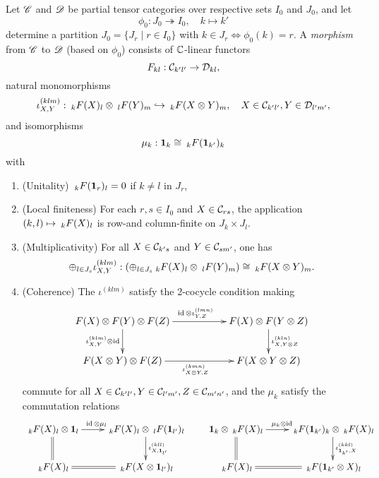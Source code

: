 \begin{Def} Let $\CatCC$ and $\CatDD$ be partial tensor categories over respective sets $I_0$ and $J_0$, and let \[\phi_0:J_0\twoheadrightarrow I_0,\quad k\mapsto k'\] determine a partition $J_0 = \{J_r\mid r\in I_0\}$ with $k\in J_r \iff \phi_0(k)=r$. 
A \emph{morphism} from $\CatCC$ to $\CatDD$ (based on $\phi_0$) consists of $\C$-linear functors \[F_{kl}: \CatC_{k'l'}\rightarrow \CatD_{kl},\] natural monomorphisms \[\iota^{(klm)}_{X,Y}: \GrDA{F(X)}{k}{l} \otimes \GrDA{F(Y)}{l}{m} \hookrightarrow \GrDA{F(X\otimes Y)}{k}{m}, \quad X\in \CatC_{k'l'},Y\in \CatD_{l'm'},\] and isomorphisms \[\mu_{k}:  \Unit_k \cong \GrDA{F(\Unit_{k'})}{k}{k}\] with \begin{enumerate}[label=(\alph*)]
\item (Unitality)  $\GrDA{F(\Unit_{r})}{k}{l}= 0$ if $k\neq l$ in $J_r$,
\item (Local finiteness) For each $r,s\in I_0$ and $X\in \CatC_{rs}$, the application $(k,l)\mapsto \GrDA{F(X)}{k}{l}$ is row-and column-finite on $J_k\times J_l$. 
\item (Multiplicativity) For all $X\in \CatC_{k's}$ and $Y\in \CatC_{sm'}$, one has\[\oplus_{l\in J_s} \iota^{(klm)}_{X,Y}: \left(\oplus_{l\in J_s} \GrDA{F(X)}{k}{l} \otimes \GrDA{F(Y)}{l}{m}\right) \cong \GrDA{F(X\otimes Y)}{k}{m}.\]
\item (Coherence) %
The $\iota^{(klm)}$ satisfy the 2-cocycle condition making \[\xymatrix{F(X)\otimes F(Y)\otimes F(Z) \ar[rr]^{\id\otimes \iota^{(lmn)}_{Y,Z}} \ar[d]_{\iota^{(klm)}_{X,Y}\otimes\id}&& F(X)\otimes F(Y\otimes Z)\ar[d]^{\iota^{(kln)}_{X,Y\otimes Z}}\\ F(X\otimes Y)\otimes F(Z) \ar[rr]_{\iota^{(kmn)}_{X\otimes Y,Z}}&& F(X\otimes Y \otimes Z)}\] commute for all $X\in \CatC_{k'l'},Y\in \CatC_{l'm'}, Z\in \CatC_{m'n'}$, and the $\mu_k$ satisfy the commutation relations \[\xymatrix{ \GrDA{F(X)}{k}{l}\otimes \Unit_l \ar[r]^{\!\!\!\!\id\otimes \mu_l} \ar@{=}[d] & \GrDA{F(X)}{k}{l} \otimes \GrDA{F(\Unit_{l'})}{l}{l} \ar[d]^{\iota^{(kll)}_{X, \Unit_{l'}}} \\ \GrDA{F(X)}{k}{l} & \ar@{=}[l] \GrDA{F(X\otimes \Unit_{l'})}{k}{l}} \qquad \xymatrix{  \Unit_k\otimes \GrDA{F(X)}{k}{l}\ar[r]^{\!\!\!\!\mu_k\otimes \id} \ar@{=}[d] & \GrDA{F(\Unit_{k'})}{k}{k} \otimes \GrDA{F(X)}{k}{l} \ar[d]^{\iota^{(kkl)}_{\Unit_{k'},X}} \\ \GrDA{F(X)}{k}{l} & \ar@{=}[l] \GrDA{ F(\Unit_{k'}\otimes X)}{k}{l}} \]
\end{enumerate}
\end{Def}

